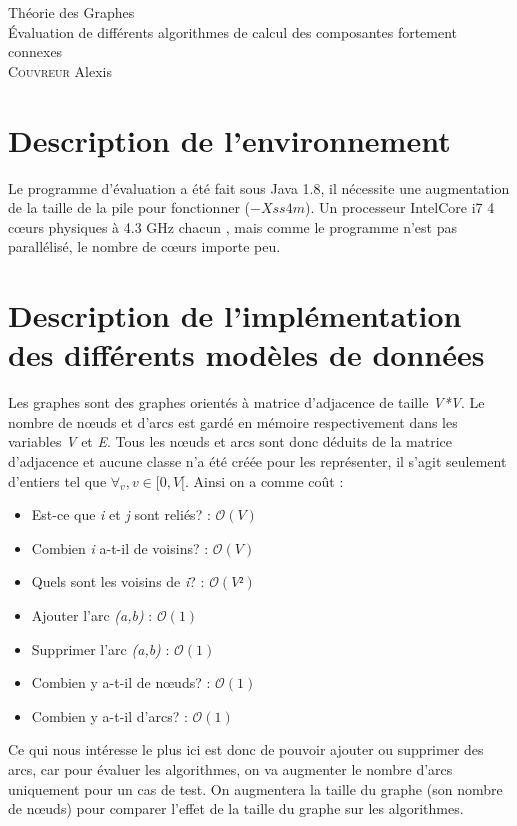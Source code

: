 \documentclass[11pt,a4paper]{article}
\begin{document}
\pagestyle{empty}

\begin{center}
{\LARGE Théorie des Graphes} \\[.8cm]
{\LARGE Évaluation de différents algorithmes de calcul des composantes fortement connexes} \\[.8cm]
{\large \textsc{Couvreur} Alexis \quad} \\[2cm]
\end{center}

\tableofcontents


\clearpage

\pagestyle{fancy}

\section{Description de l'environnement}
Le programme d'évaluation a été fait sous Java 1.8, il nécessite une augmentation de la taille de la pile pour fonctionner ($-Xss4m$). Un processeur IntelCore i7 4 cœurs physiques à 4.3 GHz chacun , mais comme le programme n'est pas parallélisé, le nombre de cœurs importe peu.

\section{Description de l'implémentation des différents modèles de données}
Les graphes sont des graphes orientés à matrice d'adjacence de taille \textit{V*V}.\linebreak
Le nombre de nœuds et d'arcs est gardé en mémoire respectivement dans les variables \textit{V} et \textit{E}.\linebreak
Tous les nœuds et arcs sont donc déduits de la matrice d'adjacence et aucune classe n'a été créée pour les représenter, il s'agit seulement d'entiers tel que $\forall_v, v \in [0, V[$.\linebreak
Ainsi on a comme coût :
\begin{itemize}
\item Est-ce que \textit{i} et \textit{j} sont reliés? : $\mathcal{O}(V)$
\item Combien \textit{i} a-t-il de voisins? : $\mathcal{O}(V)$
\item Quels sont les voisins de \textit{i}? : $\mathcal{O}(V²)$
\item Ajouter l'arc \textit{(a,b)} : $\mathcal{O}(1)$ 
\item Supprimer l'arc \textit{(a,b)} : $\mathcal{O}(1)$ 
\item Combien y a-t-il de nœuds? : $\mathcal{O}(1)$
\item Combien y a-t-il d'arcs? : $\mathcal{O}(1)$
\end{itemize}
Ce qui nous intéresse le plus ici est donc de pouvoir ajouter ou supprimer des arcs, car pour évaluer les algorithmes, on va augmenter le nombre d'arcs uniquement pour un cas de test. On augmentera la taille du graphe (son nombre de nœuds) pour comparer l'effet de la taille du graphe sur les algorithmes.\linebreak
\end{document}
